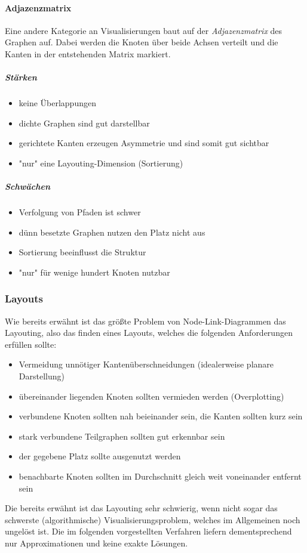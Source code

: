 \paragraph{Adjazenzmatrix}
Eine andere Kategorie an Visualisierungen baut auf der \emph{Adjazenzmatrix} des Graphen auf. Dabei werden die Knoten über beide Achsen verteilt und die Kanten in der entstehenden Matrix markiert.

\subparagraph{Stärken}
\begin{itemize}
	\item keine Überlappungen
	\item dichte Graphen sind gut darstellbar
	\item gerichtete Kanten erzeugen Asymmetrie und sind somit gut sichtbar
	\item "nur" eine Layouting-Dimension (Sortierung)
\end{itemize}

\subparagraph{Schwächen}
	\begin{itemize}
		\item Verfolgung von Pfaden ist schwer
		\item dünn besetzte Graphen nutzen den Platz nicht aus
		\item Sortierung beeinflusst die Struktur
		\item "nur" für wenige hundert Knoten nutzbar
	\end{itemize}

\subsubsection{Layouts}
Wie bereits erwähnt ist das größte Problem von Node-Link-Diagrammen das Layouting, also das finden eines Layouts, welches die folgenden Anforderungen erfüllen sollte:
\begin{itemize}
	\item Vermeidung unnötiger Kantenüberschneidungen (idealerweise planare Darstellung)
	\item übereinander liegenden Knoten sollten vermieden werden (Overplotting)
	\item verbundene Knoten sollten nah beieinander sein, \dh die Kanten sollten kurz sein
	\item stark verbundene Teilgraphen sollten gut erkennbar sein
	\item der gegebene Platz sollte ausgenutzt werden
	\item benachbarte Knoten sollten im Durchschnitt gleich weit voneinander entfernt sein
\end{itemize}
Die bereits erwähnt ist das Layouting sehr schwierig, wenn nicht sogar das schwerste (algorithmische) Visualisierungsproblem, welches im Allgemeinen noch ungelöst ist. Die im folgenden vorgestellten Verfahren liefern dementsprechend nur Approximationen und keine exakte Lösungen.

